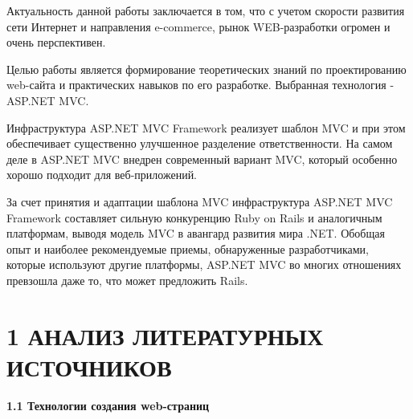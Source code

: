 \documentclass[14pt,a4paper]{extreport}
\begin{document}
	Актуальность данной работы заключается в том, что с учетом скорости развития сети Интернет и направления e-commerce, рынок WEB-разработки огромен и очень перспективен.\par
	Целью работы является формирование теоретических знаний по проектированию web-сайта и практических навыков по его разработке. Выбранная технология - ASP.NET MVC.\par
	Инфраструктура ASP.NET MVC Framework реализует шаблон MVC и при этом обеспечивает существенно улучшенное разделение ответственности. На самом деле в ASP.NET MVC внедрен современный вариант MVC, который особенно хорошо подходит для веб-приложений.\par
	За счет принятия и адаптации шаблона MVC инфраструктура ASP.NET MVC Framework составляет сильную конкуренцию Ruby on Rails и аналогичным платформам, выводя модель MVC в авангард развития мира .NET. Обобщая опыт и наиболее рекомендуемые приемы, обнаруженные разработчиками, которые используют другие платформы, ASP.NET MVC во многих отношениях превзошла даже то, что может предложить Rails.\par	

	\newpage
	\section*{\normalsize\hspace{4ex}1 АНАЛИЗ ЛИТЕРАТУРНЫХ ИСТОЧНИКОВ}
	\textbf{1.1  Технологии создания web-страниц}
\end{document}
